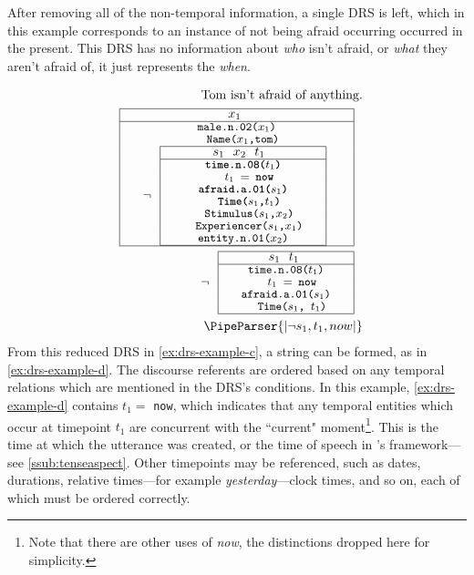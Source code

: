 \documentclass[a4paper,12pt,leqno]{article}
\def\drs#1#2{
\renewcommand{\arraystretch}{0.8}
\begin{tabular}[c]{|>{\hspace{1pc}}c<{\hspace{1pc}}|}
	\hline #1 \\
	\hline #2 \\
	\hline
\end{tabular}
\renewcommand{\arraystretch}{1}
}
\newcommand{\vph}[1]{\vphantom{#1}}
\newcommand{\ebox}[1]{\fbox{$\vph{'(),}#1$}}
\newcommand{\EventString}[1]{%
	\renewcommand*{\do}[1]{\ebox{##1}}%
	\PipeParser{#1}%
}
\begin{document}
After removing all of the non-temporal information, a single DRS is left, which in this example corresponds to an instance of not being afraid occurring occurred in the present. This DRS has no information about \textit{who} isn't afraid, or \textit{what} they aren't afraid of, it just represents the \textit{when}.

\begingroup
\setlength{\abovedisplayskip}{-10pt}%
\setlength{\belowdisplayskip}{0pt}%
\setlength{\abovedisplayshortskip}{-10pt}%
\setlength{\belowdisplayshortskip}{0pt}%

\begin{subequations}
	\label{ex:drs-example}
	\begin{align}
	\text{Tom isn't afraid of anything.}\label{ex:drs-example-a}\\
	\text{\drs{$x_1$ \hfill}{
		{\small\texttt{male.n.02($x_1$)}}\\
		{\small\texttt{~~Name($x_1$,tom)}}\\
		$\neg{}$ \drs{$s_1$~~$x_2$~~$t_1$~ \hfill}{
			{\small\textbf{\texttt{time.n.08($t_1$)}}}\\
			{\small\textbf{\texttt{~~$t_1$ $=$ now}}}\\
			{\small\textbf{\texttt{afraid.a.01($s_1$)}}}\\
			{\small\textbf{\texttt{~~Time($s_1$,$t_1$)}}}\\
			{\small\texttt{~~Stimulus($s_1$,$x_2$)}}\\
			{\small\texttt{~~Experiencer($s_1$,$x_1$)}}\\
			{\small\texttt{entity.n.01($x_2$)}}
		}
	}}\label{ex:drs-example-b}\\
	\text{$\neg{}$ \drs{$s_1$~~$t_1$ \hfill}{
		{\small\texttt{time.n.08($t_1$)}}\\
		{\small\texttt{~~$t_1$ $=$ now}}\\
		{\small\texttt{afraid.a.01($s_1$)}}\\
		{\small\texttt{~~Time($s_1$, $t_1$)}}
	}}\label{ex:drs-example-c}\\
	\EventString{|\neg{} s_1, t_1, now|}\label{ex:drs-example-d}
	\end{align}
\end{subequations}
\endgroup
From this reduced DRS in \cref{ex:drs-example-c}, a string can be formed, as in \cref{ex:drs-example-d}. The discourse referents are ordered based on any temporal relations which are mentioned in the DRS's conditions. In this example, \cref{ex:drs-example-d} contains $t_1 =$ \texttt{now}, which indicates that any temporal entities which occur at timepoint $t_1$ are concurrent with the ``current" moment\footnote{Note that there are other uses of \textit{now}, the distinctions dropped here for simplicity.}. This is the time at which the utterance was created, or the time of speech in \citet{reichenbach1947elements}'s framework---see \cref{ssub:tenseaspect}. Other timepoints may be referenced, such as dates, durations, relative times---for example \textit{yesterday}---clock times, and so on, each of which must be ordered correctly.
\end{document}
